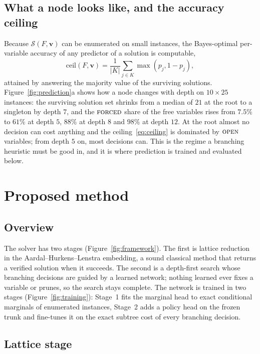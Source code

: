 \documentclass[final,5p,times,twocolumn,authoryear]{elsarticle}
\newcommand{\SOL}{\mathcal{S}}
\newcommand{\FORCED}{\textsc{forced}}
\newcommand{\FREE}{\textsc{open}}
\begin{document}
\subsection{What a node looks like, and the accuracy ceiling}
\label{sec:problem-ceiling}

Because $\SOL(F,\mathbf{v})$ can be enumerated on small instances, the Bayes-optimal per-variable accuracy of any predictor of a solution is computable,
\begin{equation}
\mathrm{ceil}(F,\mathbf{v})=\frac{1}{|K|}\sum_{j\in K}\max(p_j,1-p_j),
\label{eq:ceiling}
\end{equation}
attained by answering the majority value of the surviving solutions. Figure~\ref{fig:prediction}a shows how a node changes with depth on $10\times25$ instances: the surviving solution set shrinks from a median of $21$ at the root to a singleton by depth $7$, and the $\FORCED$ share of the free variables rises from $7.5\%$ to $61\%$ at depth $5$, $88\%$ at depth $8$ and $98\%$ at depth $12$. At the root almost no decision can cost anything and the ceiling~\eqref{eq:ceiling} is dominated by $\FREE$ variables; from depth $5$ on, most decisions can. This is the regime a branching heuristic must be good in, and it is where prediction is trained and evaluated below.

\section{Proposed method}
\label{sec:method}

\subsection{Overview}
\label{sec:method-overview}

The solver has two stages (Figure~\ref{fig:framework}). The first is lattice reduction in the Aardal--Hurkens--Lenstra embedding, a sound classical method that returns a verified solution when it succeeds. The second is a depth-first search whose branching decisions are guided by a learned network; nothing learned ever fixes a variable or prunes, so the search stays complete. The network is trained in two stages (Figure~\ref{fig:training}): Stage~1 fits the marginal head to exact conditional marginals of enumerated instances, Stage~2 adds a policy head on the frozen trunk and fine-tunes it on the exact subtree cost of every branching decision.

\subsection{Lattice stage}
\label{sec:method-lattice}
\end{document}
